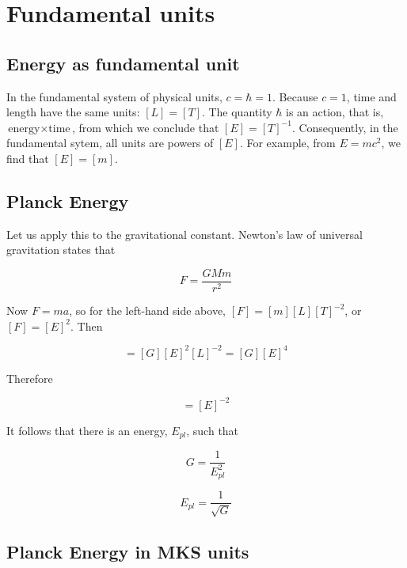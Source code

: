 \section{Fundamental units}


\innertableofcontents

\subsection{Energy as fundamental unit}
In the fundamental system of  physical units, $c = \hbar = 1$. Because $c = 1$, time and length have the same units: $[L] = [T]$. The quantity $\hbar$ is
an action, that is, $\text{energy}\times \text{time}$, from which we conclude that $[E] = [T]^{-1}$.  Consequently, in the fundamental sytem, all units are powers of $[E]$.  For example, from $E = mc^2$, we find that $[E] = [m]$. 
\medskip

\subsection{Planck Energy}

Let us apply this to the gravitational constant.  Newton's law of universal gravitation states that 
\medskip

\begin{equation}
F = \frac{GMm}{r^2}
\end{equation} 


Now $F  = ma$, so for the left-hand side above, $[F] = [m][L][T]^{-2}$, or $[F] = [E]^2$.  Then


\begin{equation}
[F] = [G][E]^2[L]^{-2} = [G][E]^4
\end{equation}


Therefore 

\begin{equation}
[G] = [E]^{-2}
\end{equation}

It follows that there is an energy, $E_{pl}$, such that 

\begin{equation}
G = \frac{1}{E_{pl}^2}
\end{equation}



\begin{equation}
E_{pl} = \frac{1}{\sqrt G} 
\end{equation}


\subsection{Planck Energy in MKS units}


